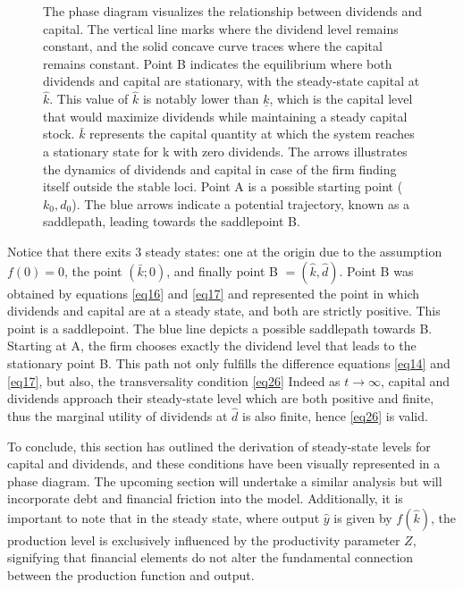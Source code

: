 \documentclass[12pt]{report}
\begin{document}
\begin{figure}
    \caption{The phase diagram visualizes the relationship between dividends and capital. The vertical line marks
    where the dividend level remains constant, and the solid concave curve traces where the capital remains constant.
    Point B indicates the equilibrium where both dividends and capital are stationary, with the steady-state capital at
    \( \hat{k} \). This value of \( \hat{k} \) is notably lower than \( \underline{k} \), which is the capital level
    that would maximize dividends while maintaining a steady capital stock. \( \bar{k} \) represents the capital
    quantity at which the system reaches a stationary state for k with zero dividends. The arrows illustrates the dynamics of dividends and capital in case of the firm finding itself outside the stable
    loci. Point A is a possible starting point (\(k_0,d_0\)). 
    The blue arrows indicate a potential trajectory, known as a saddlepath, leading towards the saddlepoint B. 
    }
    \label{fig:ph_d_nodebt}
\end{figure}
Notice that there exits 3 steady states: one at the origin due to the assumption \(f(0)=0\), the point \((\bar{k};0)\),
and finally point B \(=(\hat{k},\hat{d})\). Point B was obtained by equations \ref{eq16} and \ref{eq17} and represented the point in
which dividends and capital are at a steady state, and both are strictly positive. This point is a saddlepoint.
The blue line depicts a possible saddlepath towards B. Starting at A, the firm chooses exactly the dividend level that
leads to the stationary point B. This path not only fulfills the difference equations \ref{eq14} and \ref{eq17}, but
also, the transversality condition \ref{eq26}
Indeed as \(t \rightarrow \infty\), capital and dividends approach their steady-state level which are both positive and
finite, thus the marginal utility of dividends at \(\hat{d}\) is also finite, hence \ref{eq26} is valid.

To conclude, this section has outlined the derivation of steady-state levels for capital and dividends, and these
conditions have been visually represented in a phase diagram. The upcoming section will undertake a similar analysis but
will incorporate debt and financial friction into the model. Additionally, it is important to note that in the steady
state, where output \(\hat{y}\) is given by \(f(\hat{k})\), the production level is exclusively influenced by the
productivity parameter \(Z\), signifying that financial elements do not alter the fundamental connection between the
production function and output. 
\end{document}

